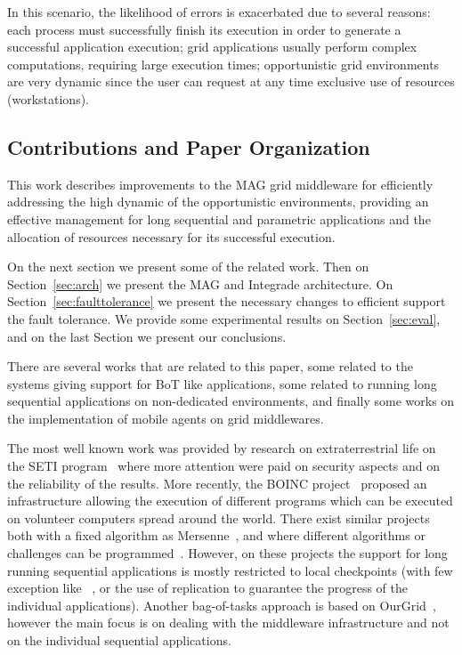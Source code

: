\documentclass[times, 10pt, twocolumn]{article}
\begin{document}
In this scenario, the likelihood of errors is exacerbated due to several
reasons: each process must successfully finish its execution in order to
generate a successful application execution; grid applications usually perform
complex computations, requiring large execution times; opportunistic grid
environments are very dynamic since the user can request at any time exclusive
use of resources (workstations).

\subsection{Contributions and Paper Organization}

This work describes improvements to the MAG grid middleware for
efficiently addressing the high dynamic of the opportunistic
environments, providing an effective management for long sequential and
parametric applications and the allocation of resources necessary for its
successful execution.

On the next section we present some of the related work. Then on
Section~\ref{sec:arch} we present the MAG and Integrade architecture. On
Section~\ref{sec:faulttolerance} we present the necessary changes to efficient
support the fault tolerance. We provide some experimental results on
Section~\ref{sec:eval}, and on the last Section we present our conclusions.




There are several works that are related to this paper, some related to the
systems giving support for BoT like applications, some related to
running long sequential applications on non-dedicated environments, and finally
some works on the implementation of mobile agents on grid middlewares.

The most well known work was provided by research on extraterrestrial life on
the SETI program~\cite{seti} where more attention were paid on security aspects
and on the reliability of the results. More recently, the BOINC
project~\cite{boinc} proposed an infrastructure allowing the execution of
different programs which can be executed on volunteer computers spread around
the world. There exist similar projects both with a fixed algorithm as
Mersenne~\cite{mersenne}, and where different algorithms or challenges can be
programmed~\cite{distributed}. However, on these projects the support for long
running sequential applications is mostly restricted to local checkpoints (with
few exception like~ \cite{climate}, or the use of replication to guarantee the
progress of the individual applications). Another bag-of-tasks approach is
based on OurGrid~\cite{cirne06}, however the main focus is on dealing with
the middleware infrastructure and not on the individual sequential
applications.
\end{document}
